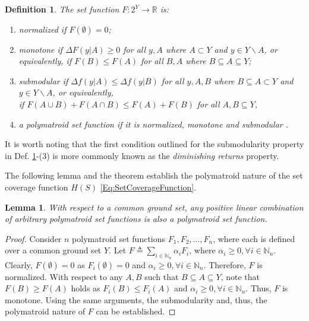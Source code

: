 \documentclass[letterpaper, 10 pt, conference]{ieeeconf}
\newcommand{\R}{\mathbb{R}}
\newcommand{\N}{\mathbb{N}}
\newtheorem{lemma}{Lemma}
\newtheorem{definition}{Definition}
\begin{document}
\begin{definition} \cite{WelikalaJ02021} \label{Def:Submodularity} The set function $F:2^Y \rightarrow \R$ is:
\begin{enumerate}
    \item \emph{normalized} if $F(\emptyset) = 0$;
    \item \emph{monotone} if $\Delta F(y \vert A)\geq 0$ for all $y,A$ where $A \subset Y$ and $y\in Y\backslash A$, or equivalently, if $F(B) \leq F(A)$ for all $B,A$ where $B \subseteq A \subseteq Y$;
    \item \emph{submodular} if $\Delta f(y\vert A) \leq \Delta f(y\vert B)$ for all $y,A,B$ where $B\subseteq A \subset Y$ and $y\in Y \backslash A$, or equivalently, \\if $F(A\cup B) + F(A\cap B) \leq F(A) + F(B)$ for all $A,B\subseteq Y$,
    \item a \emph{polymatroid} set function if it is normalized, monotone and submodular \cite{Liu2018,Boros2003}. 
\end{enumerate}
\end{definition}

It is worth noting that the first condition outlined for the submodularity property in Def. \ref{Def:Submodularity}-(3) is more commonly known as the \emph{diminishing returns} property. 

The following lemma and the theorem establish the polymatroid nature of the set coverage function $H(S)$ \eqref{Eq:SetCoverageFunction}.

\begin{lemma}\label{Lm:LinearityOfSubmodularity}
With respect to a common ground set, any positive linear combination of arbitrary polymatroid set functions is also a polymatroid set function.    
\end{lemma}
\begin{proof}
Consider $n$ polymatroid set functions $F_1,F_2,\ldots,F_n$, where each is defined over a common ground set $Y$. Let $F\triangleq \sum_{i\in\N_n} \alpha_i F_i$, where $\alpha_i \geq 0, \forall i \in\N_n$. Clearly, $F(\emptyset)=0$ as $F_i(\emptyset)=0$ and $\alpha_i \geq 0, \forall i\in\N_n$. Therefore, $F$ is normalized. With respect to any $A,B$ such that $B \subseteq A \subseteq Y$, note that $F(B)\geq F(A)$ holds as $F_i(B) \leq F_i(A)$ and $\alpha_i \geq 0, \forall i\in\N_n$. Thus, $F$ is monotone. Using the same arguments, the submodularity and, thus, the polymatroid nature of $F$ can be established.
\end{proof}
\end{document}
